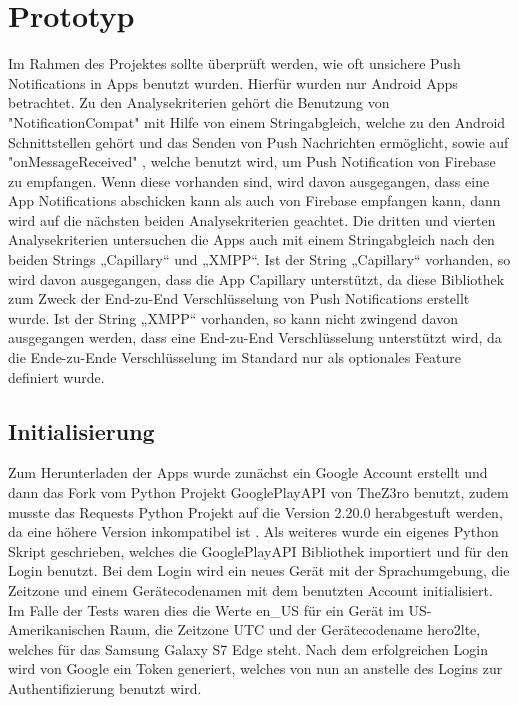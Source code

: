 \documentclass[sigconf]{acmart}
\begin{document}
\section{Prototyp}

Im Rahmen des Projektes sollte überprüft werden, wie oft unsichere Push 
Notifications in Apps benutzt wurden. Hierfür wurden nur Android Apps 
betrachtet. Zu den Analysekriterien gehört die Benutzung von 
"NotificationCompat" \cite{google} mit Hilfe von einem Stringabgleich, welche zu den 
Android Schnittstellen gehört und das Senden von Push Nachrichten ermöglicht, sowie auf "onMessageReceived" \cite{firebase3}, welche 
benutzt wird, um Push Notification von Firebase zu empfangen. 
Wenn diese vorhanden sind, wird davon ausgegangen, dass eine App 
Notifications abschicken kann als auch von Firebase empfangen kann, dann wird auf die nächsten beiden 
Analysekriterien geachtet.
Die dritten und vierten Analysekriterien untersuchen die Apps auch mit 
einem Stringabgleich nach den beiden Strings „Capillary“ und „XMPP“. Ist 
der String „Capillary“ vorhanden, so wird davon ausgegangen, dass die App 
Capillary unterstützt, da diese Bibliothek zum Zweck der End-zu-End 
Verschlüsselung von Push Notifications erstellt wurde. Ist der String „XMPP“ 
vorhanden, so kann nicht zwingend davon ausgegangen werden, dass eine 
End-zu-End Verschlüsselung unterstützt wird, da die Ende-zu-Ende 
Verschlüsselung im Standard nur als optionales Feature definiert wurde.

\subsection{Initialisierung}
Zum Herunterladen der Apps wurde zunächst ein Google Account erstellt und dann
das Fork vom Python Projekt GooglePlayAPI 
von TheZ3ro \cite{googleplayapi} benutzt, zudem musste das Requests Python Projekt auf die Version 
2.20.0 herabgestuft werden, da eine höhere Version inkompatibel ist \cite{googleplayapi1}. 
Als weiteres wurde ein eigenes Python Skript geschrieben, welches die 
GooglePlayAPI Bibliothek importiert und für den Login benutzt. Bei dem Login 
wird ein neues Gerät mit der Sprachumgebung, die Zeitzone und einem 
Gerätecodenamen mit dem benutzten Account initialisiert. Im Falle der Tests 
waren dies die Werte en\_US für ein Gerät im US-Amerikanischen Raum, die 
Zeitzone UTC und der Gerätecodename hero2lte, welches für das Samsung 
Galaxy S7 Edge steht. Nach dem erfolgreichen Login wird von Google ein Token generiert, 
welches von nun an anstelle des Logins zur Authentifizierung benutzt wird.
\end{document}
